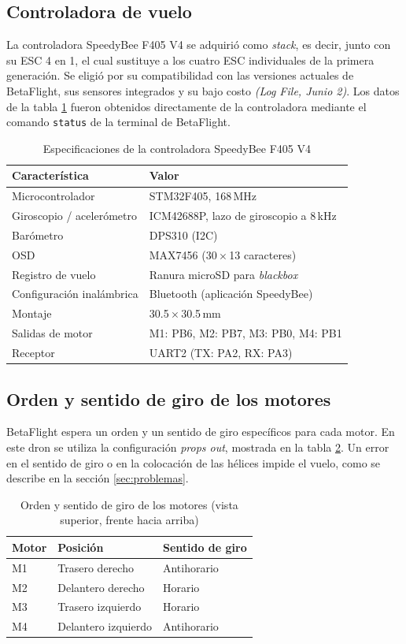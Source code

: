\documentclass[11pt,letterpaper]{article}
\newcommand{\logref}[1]{\textit{(Log File, #1)}}
\begin{document}
\subsection{Controladora de vuelo}
La controladora SpeedyBee F405 V4 se adquirió como \textit{stack}, es decir, junto con su ESC 4 en 1, el cual sustituye a los cuatro ESC individuales de la primera generación. Se eligió por su compatibilidad con las versiones actuales de BetaFlight, sus sensores integrados y su bajo costo \logref{Junio 2}. Los datos de la tabla \ref{tab:fc} fueron obtenidos directamente de la controladora mediante el comando \texttt{status} de la terminal de BetaFlight.

\begin{table}[!h]
\centering
\caption{Especificaciones de la controladora SpeedyBee F405 V4}
\label{tab:fc}
\begin{tabularx}{\textwidth}{@{}lX@{}}
\toprule
\textbf{Característica} & \textbf{Valor} \\
\midrule
Microcontrolador & STM32F405, 168\,MHz \\
Giroscopio / acelerómetro & ICM42688P, lazo de giroscopio a 8\,kHz \\
Barómetro & DPS310 (I2C) \\
OSD & MAX7456 (30\,$\times$\,13 caracteres) \\
Registro de vuelo & Ranura microSD para \textit{blackbox} \\
Configuración inalámbrica & Bluetooth (aplicación SpeedyBee) \\
Montaje & 30.5\,$\times$\,30.5\,mm \\
Salidas de motor & M1: PB6, M2: PB7, M3: PB0, M4: PB1 \\
Receptor & UART2 (TX: PA2, RX: PA3) \\
\bottomrule
\end{tabularx}
\end{table}

\subsection{Orden y sentido de giro de los motores}
BetaFlight espera un orden y un sentido de giro específicos para cada motor. En este dron se utiliza la configuración \textit{props out}, mostrada en la tabla \ref{tab:motores}. Un error en el sentido de giro o en la colocación de las hélices impide el vuelo, como se describe en la sección \ref{sec:problemas}.

\begin{table}[!h]
\centering
\caption{Orden y sentido de giro de los motores (vista superior, frente hacia arriba)}
\label{tab:motores}
\begin{tabular}{@{}lll@{}}
\toprule
\textbf{Motor} & \textbf{Posición} & \textbf{Sentido de giro} \\
\midrule
M1 & Trasero derecho & Antihorario \\
M2 & Delantero derecho & Horario \\
M3 & Trasero izquierdo & Horario \\
M4 & Delantero izquierdo & Antihorario \\
\bottomrule
\end{tabular}
\end{table}
\end{document}
